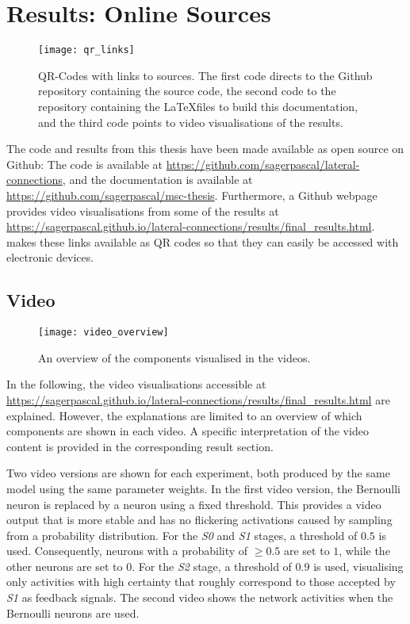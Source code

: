 \chapter{Results: Online Sources}
%
\begin{figure}[h]
    \centering
    \texttt{[image: qr\_links]}
    \caption[QR-Codes with links to sources]{QR-Codes with links to sources. The first code directs to the Github repository containing the source code, the second code to the repository containing the \LaTeX files to build this documentation, and the third code points to video visualisations of the results.}
\end{figure}
%
The code and results from this thesis  have been made available as open source on Github: The code is available at \url{https://github.com/sagerpascal/lateral-connections}, and the documentation is available at \url{https://github.com/sagerpascal/msc-thesis}.
Furthermore, a Github webpage provides video visualisations from some of the results at \url{https://sagerpascal.github.io/lateral-connections/results/final_results.html}.
 makes these links available as QR codes so that they can easily be accessed with electronic devices.

\section{Video}
%
\begin{figure}[h]
    \centering
    \texttt{[image: video\_overview]}
    \caption[Overview of components visualised in the videos]{An overview of the components visualised in the videos.}
\end{figure}
%
In the following, the video visualisations accessible at \url{https://sagerpascal.github.io/lateral-connections/results/final_results.html} are explained.
However, the explanations are limited to an overview of which components are shown in each video.
A specific interpretation of the video content is provided in the corresponding result section.

Two video versions are shown for each experiment, both produced by the same model using the same parameter weights.
In the first video version, the Bernoulli neuron is replaced by a neuron using a fixed threshold.
This provides a video output that is more stable and has no flickering activations caused by sampling from a probability distribution.
For the \emph{S0} and \emph{S1} stages, a threshold of $0.5$ is used. Consequently, neurons with a probability of $\geq 0.5$ are set to $1$, while the other neurons are set to $0$.
For the \emph{S2} stage, a threshold of $0.9$ is used, visualising only activities with high certainty that roughly correspond to those accepted by \emph{S1} as feedback signals.
The second video shows the network activities when the Bernoulli neurons are used.

